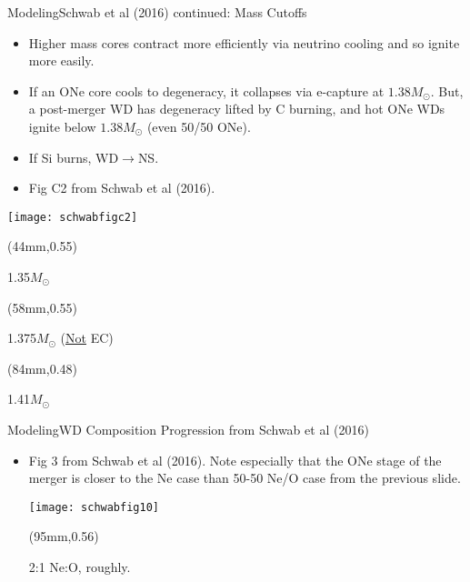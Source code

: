 \documentclass{beamer}
\begin{document}
\begin{frame}{Modeling}{Schwab et al (2016) continued: Mass Cutoffs}
\begin{itemize}
    \item {Higher mass cores contract more efficiently via neutrino cooling and so ignite more easily.}
    \item {If an ONe core cools to degeneracy, it collapses via e-capture at $1.38M_{\odot}$. But, a post-merger WD has degeneracy lifted by C burning, and hot ONe WDs ignite below $1.38M_{\odot}$ (even 50/50 ONe).}
    \item {If Si burns, WD$\rightarrow$NS.}
    \item {Fig C2 from Schwab et al (2016). }
\end{itemize}
    \begin{center}\texttt{[image: schwabfigc2]}\end{center}
\begin{textblock*}{64mm}(44mm,0.55\textheight)
\begin{exampleblock}{}
  1.35$M_{\odot}$ 
\end{exampleblock}
\end{textblock*}

\begin{textblock*}{64mm}(58mm,0.55\textheight)
\begin{exampleblock}{}
  1.375$M_{\odot}$ (\underline{Not} EC)
\end{exampleblock}
\end{textblock*}

\begin{textblock*}{64mm}(84mm,0.48\textheight)
\begin{exampleblock}{}
  1.41$M_{\odot}$ 
\end{exampleblock}
\end{textblock*}
\end{frame}

\begin{frame}{Modeling}{WD Composition Progression from Schwab et al (2016)}
\begin{itemize}
\item {Fig 3 from Schwab et al (2016). Note especially that the ONe stage of the merger is closer to the Ne case than 50-50 Ne/O case from the previous slide. }
\begin{center}\texttt{[image: schwabfig10]}\end{center}
\begin{textblock*}{64mm}(95mm,0.56\textheight)
\begin{exampleblock}{}
  2:1 Ne:O, roughly.
\end{exampleblock}
\end{textblock*}

\end{itemize}
\end{frame}
\end{document}
